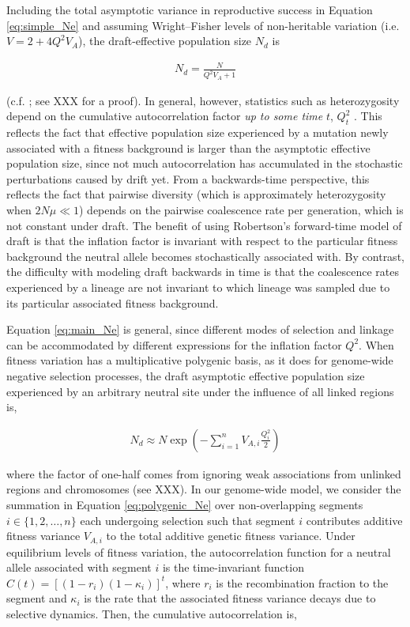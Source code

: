 \documentclass[11pt]{article}
\begin{document}
Including the total asymptotic variance in reproductive success in Equation
\eqref{eq:simple_Ne} and assuming Wright--Fisher levels of non-heritable
variation (i.e. $V = 2 + 4 Q^2 V_A$), the draft-effective population size $N_d$
is

\begin{align}
    \label{eq:main_Ne}
    N_d = \frac{N}{Q^2 V_A + 1}
\end{align}

(c.f. \cite{Robertson1961-ho,Santiago1995-hx}; see XXX for a proof). In
general, however, statistics such as heterozygosity depend on the cumulative
autocorrelation factor \emph{up to some time} $t$, $Q_t^2$ \parencite[p.
2111]{Santiago1998-bs}. This reflects the fact that effective population size
experienced by a mutation newly associated with a fitness background is larger
than the asymptotic effective population size, since not much autocorrelation
has accumulated in the stochastic perturbations caused by drift yet. From a
backwards-time perspective, this reflects the fact that pairwise diversity
(which is approximately heterozygosity when $2N\mu \ll 1$) depends on the
pairwise coalescence rate per generation, which is not constant under draft.
The benefit of using Robertson's forward-time model of draft is that the
inflation factor is invariant with respect to the particular fitness background
the neutral allele becomes stochastically associated with. By contrast, the
difficulty with modeling draft backwards in time is that the coalescence rates
experienced by a lineage are not invariant to which lineage was sampled due to
its particular associated fitness background.

Equation \eqref{eq:main_Ne} is general, since different modes of selection and
linkage can be accommodated by different expressions for the inflation factor
$Q^2$. When fitness variation has a multiplicative polygenic basis, as it does
for genome-wide negative selection processes, the draft asymptotic effective
population size experienced by an arbitrary neutral site under the influence of
all linked regions is,

\begin{align}
    \label{eq:polygenic_Ne}
    N_d \approx N \exp\left(-\sum_{i=1}^n V_{A,i} \frac{Q_i^2}{2}\right)
\end{align}

where the factor of one-half comes from ignoring weak associations from
unlinked regions and chromosomes (see XXX). In our genome-wide model, we
consider the summation in Equation \eqref{eq:polygenic_Ne} over non-overlapping
segments $i \in \{1, 2, \ldots, n\}$ each undergoing selection such that
segment $i$ contributes additive fitness variance $V_{A,i}$ to the total
additive genetic fitness variance. Under equilibrium levels of fitness
variation, the autocorrelation function for a neutral allele associated with
segment $i$ is the time-invariant function $C(t) = [(1-r_i)(1-\kappa_i)]^t$,
where $r_i$ is the recombination fraction to the segment and $\kappa_i$ is the
rate that the associated fitness variance decays due to selective dynamics.
Then, the cumulative autocorrelation is,
\end{document}
